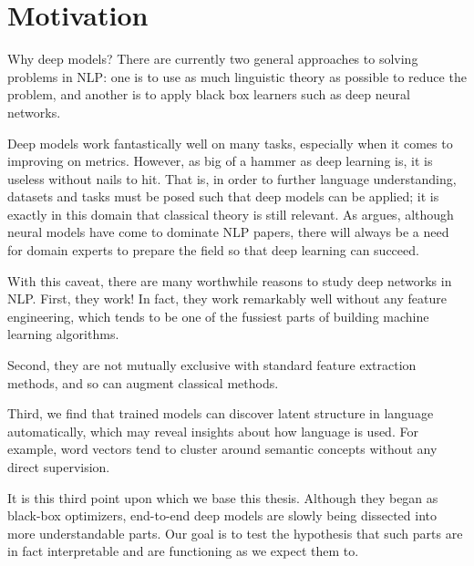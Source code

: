 \documentclass[12pt]{report}
\begin{document}
\section{Motivation}


Why deep models? There are currently two general approaches to solving problems in NLP: one is to use as much linguistic theory as possible to reduce the problem, and another is to apply black box learners such as deep neural networks.

Deep models work fantastically well on many tasks, especially when it comes to improving on metrics. However, as big of a hammer as deep learning is, it is useless without nails to hit.
That is, in order to further language understanding, datasets and tasks must be posed such that deep models can be applied; it is exactly in this domain that classical theory is still relevant.
As \citet{Manning2016} argues, although neural models have come to dominate NLP papers, there will always be a need for domain experts to prepare the field so that deep learning can succeed.


With this caveat, there are many worthwhile reasons to study deep networks in NLP. First, they work! In fact, they work remarkably well without any feature engineering, which tends to be one of the fussiest parts of building machine learning algorithms.

Second, they are not mutually exclusive with standard feature extraction methods, and so can augment classical methods.

Third, we find that trained models can discover latent structure in language automatically, which may reveal insights about how language is used. For example, word vectors tend to cluster around semantic concepts without any direct supervision.


It is this third point upon which we base this thesis. Although they began as black-box optimizers, end-to-end deep models are slowly being dissected into more understandable parts. Our goal is to test the hypothesis that such parts are in fact interpretable and are functioning as we expect them to.
\end{document}
